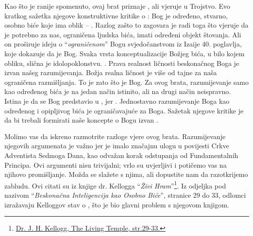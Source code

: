 
Kao što je ranije spomenuto, ovaj brat priznaje , ali vjeruje u Trojstvo. Evo kratkog sažetka njegove konstruktivne kritike o : Bog je određeno, stvarno, osobno biće koje ima oblik – . Razlog zašto to zagovara je radi toga što vjeruje da je potrebno za nas, ograničena ljudska bića, imati određeni objekt štovanja. Ali on proširuje ideju o “\textit{ograničenom}” Bogu svjedočanstvom iz Izaije 40. poglavlja, koje dokazuje da je Bog. Svaka vrsta konceptualizacije Božjeg bića, u bilo kojem obliku, slična je idolopoklonstvu. . Prava realnost ličnosti beskonačnog Boga je izvan našeg razumijevanja. Božja realna ličnost je više od tajne za naša ograničena razmišljanja. To je zato što je Bog. Za ovog brata, razumijevanje  samo kao određenog bića je na jedan način istinito, ali na drugi način neispravno. Istina je da se Bog predstavio u , jer . Jednostavno razumijevanje Boga kao određenog i opipljivog bića je ograničavajuće za Boga. Sažetak njegove kritike je da bi trebali formirati naše koncepte o Bogu izvan .

Molimo vas da iskreno razmotrite razloge vjere ovog brata. Razumijevanje njegovih argumenata je važno jer je imalo značajnu ulogu u povijesti Crkve Adventista Sedmoga Dana, kao odvažan korak odstupanja od Fundamentalnih Principa. Ovi argumenti nisu trivijalni; vrlo su uvjerljivi i potičemo vas na njihovo promišljanje. Možda se slažete s njima, ali dopustite nam da razotkrijemo zabludu. Ovi citati su iz knjige dr. Kellogga “\textit{Živi Hram}”\footnote{\href{https://archive.org/details/J.H.Kellogg.TheLivingTemple1903}{Dr. J. H. Kellogg, The Living Temple, str.29-33.}}. Iz odjeljka pod nazivom “\textit{Beskonačna Inteligencija kao Osobno Biće}”, stranice 29 do 33, odlomci izražavaju Kelloggov stav o , što je bio glavni problem s njegovom knjigom.

